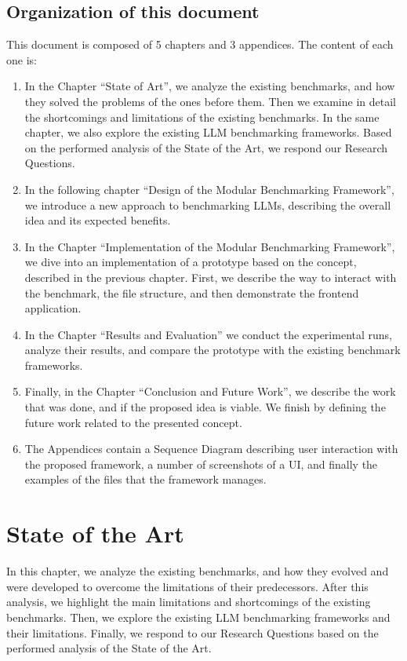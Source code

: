 \subsection{Organization of this document}

This document is composed of 5 chapters and 3 appendices.
The content of each one is:
\begin{enumerate}
    \item In the Chapter ``State of Art'', we analyze the existing benchmarks, and how they solved the problems of the ones before them.
    Then we examine in detail the shortcomings and limitations of the existing benchmarks.
    In the same chapter, we also explore the existing LLM benchmarking frameworks.
    Based on the performed analysis of the State of the Art, we respond our Research Questions.
    \item In the following chapter ``Design of the Modular Benchmarking Framework'', we introduce a new approach to benchmarking LLMs, describing the overall idea and its expected benefits.
    \item In the Chapter ``Implementation of the Modular Benchmarking Framework'', we dive into an implementation of a prototype based on the concept, described in the previous chapter.
    First, we describe the way to interact with the benchmark, the file structure, and then demonstrate the frontend application.
    \item In the Chapter ``Results and Evaluation'' we conduct the experimental runs, analyze their results, and compare the prototype with the existing benchmark frameworks.
    \item Finally, in the Chapter ``Conclusion and Future Work'', we describe the work that was done, and if the proposed idea is viable.
    We finish by defining the future work related to the presented concept.
    \item The Appendices contain a Sequence Diagram describing user interaction with the proposed framework, a number of screenshots of a UI, and finally the examples of the files that the framework manages.
\end{enumerate}

\section{State of the Art}

In this chapter, we analyze the existing benchmarks, and how they evolved and were developed to overcome the limitations of their predecessors.
After this analysis, we highlight the main limitations and shortcomings of the existing benchmarks.
Then, we explore the existing LLM benchmarking frameworks and their limitations.
Finally, we respond to our Research Questions based on the performed analysis of the State of the Art.

